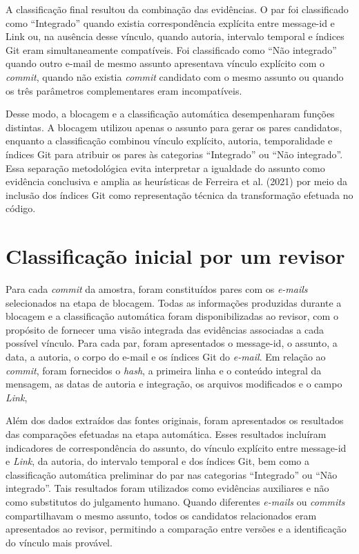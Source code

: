 A classificação final resultou da combinação das evidências. O par foi classificado como ``Integrado'' quando existia correspondência explícita entre message-id e Link ou, na ausência desse vínculo, quando autoria, intervalo temporal e índices Git eram simultaneamente compatíveis. Foi classificado como ``Não integrado'' quando outro e-mail de mesmo assunto apresentava vínculo explícito com o \textit{commit}, quando não existia \textit{commit} candidato com o mesmo assunto ou quando os três parâmetros complementares eram incompatíveis. 

Desse modo, a blocagem e a classificação automática desempenharam funções distintas. A blocagem utilizou apenas o assunto para gerar os pares candidatos, enquanto a classificação combinou vínculo explícito, autoria, temporalidade e índices Git para atribuir os pares às categorias ``Integrado'' ou ``Não integrado''. Essa separação metodológica evita interpretar a igualdade do assunto como evidência conclusiva e amplia as heurísticas de Ferreira et al. (2021) por meio da inclusão dos índices Git como representação técnica da transformação efetuada no código. 

\section{Classificação inicial por um revisor}

Para cada \textit{commit} da amostra, foram constituídos pares com os \textit{e-mails} selecionados na etapa de blocagem. Todas as informações produzidas durante a blocagem e a classificação automática foram disponibilizadas ao revisor, com o propósito de fornecer uma visão integrada das evidências associadas a cada possível vínculo. Para cada par, foram apresentados o message-id, o assunto, a data, a autoria, o corpo do e-mail e os índices Git do \textit{e-mail}. Em relação ao \textit{commit}, foram fornecidos o \textit{hash}, a primeira linha e o conteúdo integral da mensagem, as datas de autoria e integração, os arquivos modificados e o campo \textit{Link},

Além dos dados extraídos das fontes originais, foram apresentados os resultados das comparações efetuadas na etapa automática. Esses resultados incluíram indicadores de correspondência do assunto, do vínculo explícito entre message-id e \textit{Link}, da autoria, do intervalo temporal e dos índices Git, bem como a classificação automática preliminar do par nas categorias ``Integrado'' ou ``Não integrado''. Tais resultados foram utilizados como evidências auxiliares e não como substitutos do julgamento humano. Quando diferentes \textit{e-mails} ou \textit{commits} compartilhavam o mesmo assunto, todos os candidatos relacionados eram apresentados ao revisor, permitindo a comparação entre versões e a identificação do vínculo mais provável. 


